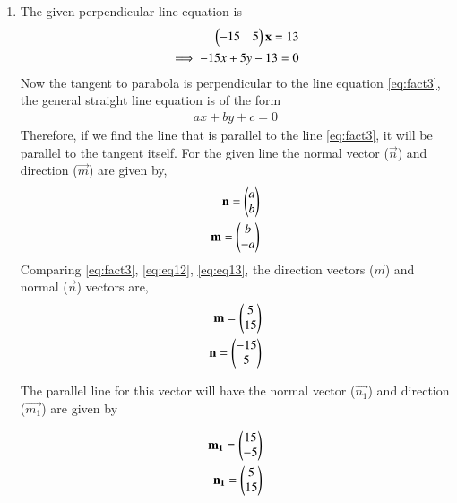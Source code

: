\documentclass[journal,12pt,twocolumn]{IEEEtran}
\begin{document}
\begin{enumerate}
	\item
						The given perpendicular line equation is
	\begin{align} 
		\begin{pmatrix}-15 & 5\end{pmatrix}\mathbf{x}= 13 \\
		\implies -15x + 5y - 13 = 0 \label{eq:fact3}
	\end{align}
	Now the tangent to parabola is perpendicular to the line equation \eqref{eq:fact3}, the general straight line equation is of the form
	\begin{align}
		ax + by + c = 0
	\end{align}
	Therefore, if we find the line that is parallel to the line \eqref{eq:fact3}, it will be parallel to the tangent itself. For the given line the normal vector ($\vec{n}$) and direction ($\vec{m}$) are given by,
	\begin{align} 
		\mathbf{n} = \begin{pmatrix}a\\b\end{pmatrix} \label{eq:eq12}\\
		\mathbf{m} = \begin{pmatrix}b\\-a\end{pmatrix} \label{eq:eq13}
	\end{align}
	Comparing \eqref{eq:fact3}, \eqref{eq:eq12}, \eqref{eq:eq13}, the direction vectors ($\vec{m}$) and normal ($\vec{n}$)  vectors are,
	\begin{align}
		\mathbf{m} = \begin{pmatrix}5\\15\end{pmatrix}\\
		\mathbf{n} = \begin{pmatrix}-15\\5\end{pmatrix}\label{eq:eq14}
	\end{align} 

	The parallel line for this vector will have the normal vector ($\vec{n_1}$) and direction ($\vec{m_1}$) are given by
	
		\begin{align}
		\mathbf{m_1} = \begin{pmatrix}15\\-5\end{pmatrix}\\
		\mathbf{n_1} = \begin{pmatrix}5\\15\end{pmatrix}\label{eq:eq15}
	\end{align} 
	

\end{enumerate}
\end{document}
